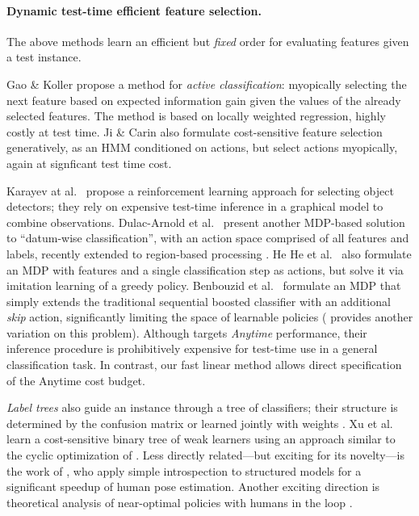 \paragraph{Dynamic test-time efficient feature selection.}
The above methods learn an efficient but \emph{fixed} order for evaluating features given a test instance.

Gao \& Koller \parencite{Gao-NIPS-2011} propose a method for \emph{active classification}: myopically selecting the next feature based on expected information gain given the values of the already selected features.
The method is based on locally weighted regression, highly costly at test time.
Ji \& Carin \parencite{Ji-PR-2007} also formulate cost-sensitive feature selection generatively, as an HMM conditioned on actions, but select actions myopically, again at signficant test time cost.

Karayev at al.\ \parencite{Karayev-NIPS-2012} propose a reinforcement learning approach for selecting object detectors; they rely on expensive test-time inference in a graphical model to combine observations.
Dulac-Arnold et al.\ \parencite{DulacArnold-ML-2012} present another MDP-based solution to ``datum-wise classification'', with an action space comprised of all features and labels, recently extended to region-based processing \parencite{DulacArnold-ICLR-2014}.
He He et al.\ \parencite{HeHe-ICMLW-2012} also formulate an MDP with features and a single classification step as actions, but solve it via imitation learning of a greedy policy.
Benbouzid et al.\ \parencite{Benbouzid-ICML-2012} formulate an MDP that simply extends the traditional sequential boosted classifier with an additional \emph{skip} action, significantly limiting the space of learnable policies (\parencite{Trapeznikov-ML-2012} provides another variation on this problem).
Although \parencite{Karayev-NIPS-2012} targets \emph{Anytime} performance, their inference procedure is prohibitively expensive for test-time use in a general classification task.
In contrast, our fast linear method allows direct specification of the Anytime cost budget.

\emph{Label trees} also guide an instance through a tree of classifiers; their structure is determined by the confusion matrix or learned jointly with weights \parencite{Deng-NIPS-2011}.
Xu et al.\ \parencite{Xu-ICML-2013} learn a cost-sensitive binary tree of weak learners using an approach similar to the cyclic optimization of \parencite{Chen-AISTATS-2012}.
Less directly related---but exciting for its novelty---is the work of \parencite{Weiss-ICCV-2013}, who apply simple introspection to structured models for a significant speedup of human pose estimation.
Another exciting direction is theoretical analysis of near-optimal policies with humans in the loop \parencite{Chen-2014-ICML}.
